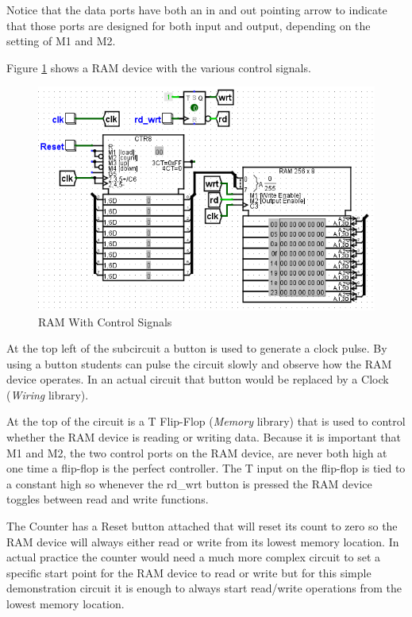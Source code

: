 Notice that the data ports have both an in and out pointing arrow to indicate that those ports are designed for both input and output, depending on the setting of M1 and M2.

Figure \ref{fig:10-02} shows a RAM device with the various control signals.

\begin{figure}[H]
	\centering
	\includegraphics[width=\maxwidth{.95\linewidth}]{gfx/10-02}
	\caption{RAM With Control Signals}
	\label{fig:10-02}
\end{figure}

At the top left of the subcircuit a button is used to generate a clock pulse. By using a button students can pulse the circuit slowly and observe how the RAM device operates. In an actual circuit that button would be replaced by a Clock (\textit{Wiring} library).

At the top of the circuit is a T Flip-Flop (\textit{Memory} library) that is used to control whether the RAM device is reading or writing data. Because it is important that M1 and M2, the two control ports on the RAM device, are never both high at one time a flip-flop is the perfect controller. The T input on the flip-flop is tied to a constant high so whenever the rd\_wrt button is pressed the RAM device toggles between read and write functions.

The Counter has a Reset button attached that will reset its count to zero so the RAM device will always either read or write from its lowest memory location. In actual practice the counter would need a much more complex circuit to set a specific start point for the RAM device to read or write but for this simple demonstration circuit it is enough to always start read/write operations from the lowest memory location.


